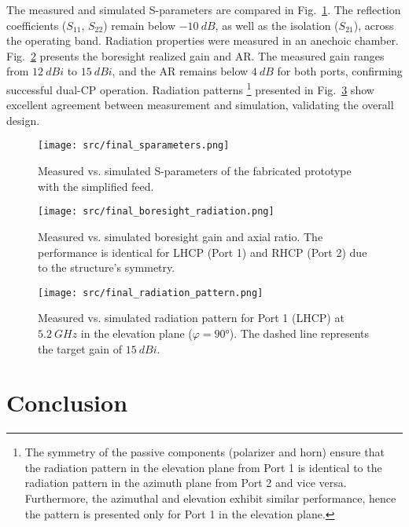 \documentclass[journal]{IEEEtran}
\begin{document}
The measured and simulated S-parameters are compared in Fig.~\ref{fig:final-sparameters}. The reflection coefficients ($S_{11}$, $S_{22}$) remain below $\qty{-10}{dB}$, as well as the isolation ($S_{21}$), across the operating band. Radiation properties were measured in an anechoic chamber. Fig.~\ref{fig:final-boresight-radiation} presents the boresight realized gain and AR. The measured gain ranges from $\qty{12}{dBi}$ to $\qty{15}{dBi}$, and the AR remains below $\qty{4}{dB}$ for both ports, confirming successful dual-CP operation. Radiation patterns%
    \footnote{The symmetry of the passive components (polarizer and horn) ensure that the radiation pattern in the elevation plane from Port 1 is identical to the radiation pattern in the azimuth plane from Port 2 and vice versa. Furthermore, the azimuthal and elevation exhibit similar performance, hence the pattern is presented only for Port 1 in the elevation plane.}
presented in Fig.~\ref{fig:final-pattern} show excellent agreement between measurement and simulation, validating the overall design.

\begin{figure}[!ht]
\centering
\texttt{[image: src/final\_sparameters.png]}
\caption{\label{fig:final-sparameters}Measured vs. simulated S-parameters of the fabricated prototype with the simplified feed.}
\end{figure}

\begin{figure}[!ht]
\centering
\texttt{[image: src/final\_boresight\_radiation.png]}
\caption{\label{fig:final-boresight-radiation}Measured vs. simulated boresight gain and axial ratio. The performance is identical for LHCP (Port 1) and RHCP (Port 2) due to the structure's symmetry.}
\end{figure}

\begin{figure}[!ht]
\centering
\texttt{[image: src/final\_radiation\_pattern.png]}
\caption{\label{fig:final-pattern}Measured vs. simulated radiation pattern for Port 1 (LHCP) at $\qty{5.2}{GHz}$ in the elevation plane ($\varphi=\ang{90}$). The dashed line represents the target gain of $\qty{15}{dBi}$.}
\end{figure}

\section{Conclusion}
\label{sec:conclusion}
\end{document}
